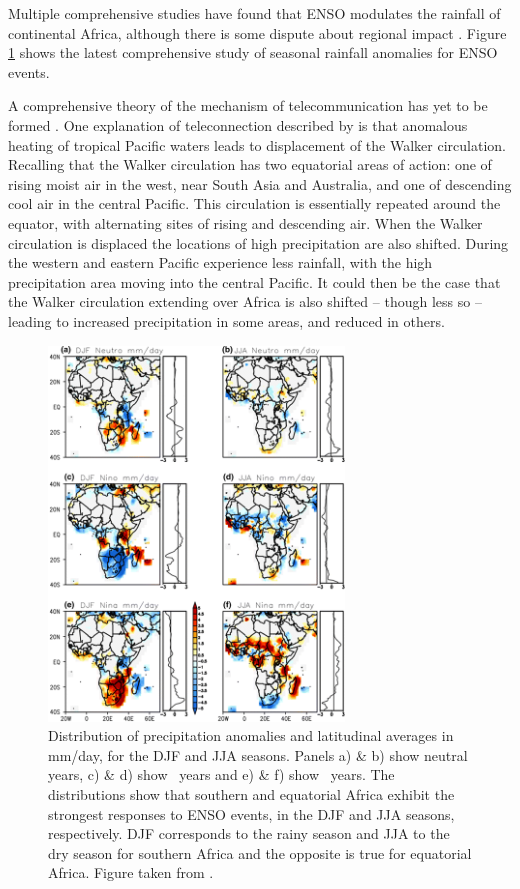 Multiple comprehensive studies \citep{ropelewski1987, ropelewski1989,
  nicholson1996} have found that ENSO modulates the rainfall of continental
Africa, although there is some dispute about regional impact
\citep{wolter1989}. Figure \ref{fig:enso_rainfall_anoms} shows the latest
comprehensive study of seasonal rainfall anomalies for ENSO events.

A comprehensive theory of the mechanism of telecommunication has yet to be formed
\citep{philander1990}. One explanation of teleconnection described by
\cite{joly2009} is that anomalous heating of tropical Pacific waters leads to
displacement of the Walker circulation. Recalling that the Walker circulation
has two equatorial areas of action: one of rising moist air in the west, near
South Asia and Australia, and one of descending cool air in the central
Pacific. This circulation is essentially repeated around the equator, with
alternating sites of rising and descending air. When the Walker circulation is
displaced the locations of high precipitation are also shifted. During \elnino{}
the western and eastern Pacific experience less rainfall, with the high
precipitation area moving into the central Pacific. It could then be the case
that the Walker circulation extending over Africa is also shifted -- though less
so -- leading to increased precipitation in some areas, and reduced in others.

\begin{figure}
  \centering
  \includegraphics[width=0.7\textwidth]{figures/enso_africa_rainfall_anoms}
  \caption{Distribution of precipitation anomalies and latitudinal averages in
    mm/day, for the DJF and JJA seasons. Panels a) \& b) show neutral years, c)
    \& d) show \elnino\ years and e) \& f) show \nina\ years. The distributions
    show that southern and equatorial Africa exhibit the strongest responses to
    ENSO events, in the DJF and JJA seasons, respectively. DJF corresponds to the
    rainy season and JJA to the dry season for southern Africa and the opposite
    is true for equatorial Africa. Figure taken from \cite{deoliveira2018}.}
  \label{fig:enso_rainfall_anoms}
\end{figure}

